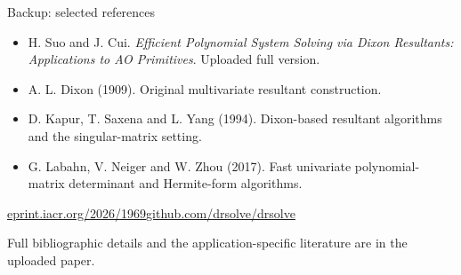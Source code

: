 \documentclass[aspectratio=169,11pt,professionalfonts]{beamer}
\newcommand{\src}[1]{\vfill{\color{Muted}\fontsize{7}{8.5}\selectfont #1\par}}
\begin{document}
\begin{frame}{Backup: selected references}
\small\begin{itemize}\setlength{\itemsep}{3mm}
\item H. Suo and J. Cui. \emph{Efficient Polynomial System Solving via Dixon Resultants: Applications to AO Primitives}. Uploaded full version.
\item A. L. Dixon (1909). Original multivariate resultant construction.
\item D. Kapur, T. Saxena and L. Yang (1994). Dixon-based resultant algorithms and the singular-matrix setting.
\item G. Labahn, V. Neiger and W. Zhou (2017). Fast univariate polynomial-matrix determinant and Hermite-form algorithms.
\end{itemize}\vspace{3mm}
\href{https://eprint.iacr.org/2026/1969}{eprint.iacr.org/2026/1969}\qquad\href{https://github.com/drsolve/drsolve}{github.com/drsolve/drsolve}
\src{Full bibliographic details and the application-specific literature are in the uploaded paper.}
\end{frame}
\end{document}
